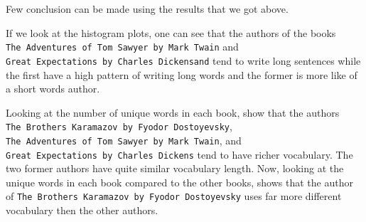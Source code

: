 \documentclass[11pt]{article}
\begin{document}
     Few conclusion can be made using the results that we got above.

If we look at the histogram plots, one can see that the authors of the
books \texttt{The\ Adventures\ of\ Tom\ Sawyer\ by\ Mark\ Twain} and
\texttt{Great\ Expectations\ by\ Charles\ Dickensand} tend to write long
sentences while the first have a high pattern of writing long words and
the former is more like of a short words author.

Looking at the number of unique words in each book, show that the
authors \texttt{The\ Brothers\ Karamazov\ by\ Fyodor\ Dostoyevsky},
\texttt{The\ Adventures\ of\ Tom\ Sawyer\ by\ Mark\ Twain}, and
\texttt{Great\ Expectations\ by\ Charles\ Dickens} tend to have richer
vocabulary. The two former authors have quite similar vocabulary length.
Now, looking at the unique words in each book compared to the other
books, shows that the author of
\texttt{The\ Brothers\ Karamazov\ by\ Fyodor\ Dostoyevsky} uses far more
different vocabulary then the other authors. 


    
    
    
\end{document}
